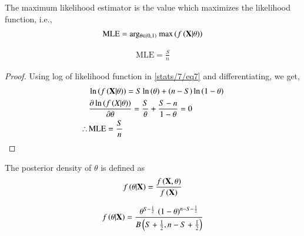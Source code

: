     \begin{definition}
    The maximum likelihood estimator is the value which maximizes the likelihood function, i.e.,
    \begin{align}
        \text{MLE} = \text{arg$_{\theta \in (0,1)}$ max}\left(f\left(\mathbf{X}|\theta\right)\right)
    \end{align}
    \end{definition}
    \begin{lemma}
    \begin{align}
        \text{MLE} = \frac{S}{n}
    \end{align}
    \end{lemma}
    \begin{proof}
    Using log of likelihood function in \eqref{stats/7/eq7} and differentiating,  we get,
    \begin{align}
        &\ln\left({f\left(\mathbf{X}|\theta\right)}\right) = S\ln\left({\theta}\right) + \left(n-S\right)\ln\left({1-\theta}\right)\\
        &\frac{\partial \ln\left({f\left(X|\theta\right)}\right)}{\partial \theta} = \frac{S}{\theta} + \frac{S-n}{1-\theta} = 0 \nonumber\\
         \therefore\, &\text{MLE} = \frac{S}{n}
    \end{align}
    \end{proof}
    \begin{definition}
    The posterior density of $\theta$ is defined as 
    \begin{align}
        f\left(\theta|\mathbf{X}\right) = \frac{f\left(\mathbf{X},\theta\right)}{f\left(\mathbf{X}\right)}
    \end{align}
    \end{definition}
    \begin{lemma}
    \begin{align}
        f\left(\theta|\mathbf{X}\right) = \frac{\theta^{S-\frac{1}{2}}\,\left(1-\theta\right)^{n-S-\frac{1}{2}}}{B\left(S+\frac{1}{2},n-S+\frac{1}{2}\right)}
    \end{align}
    \end{lemma}
